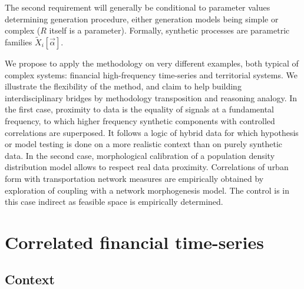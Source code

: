 \documentclass{bmcart}
\begin{document}
The second requirement will generally be conditional to parameter values determining generation procedure, either generation models being simple or complex ($R$ itself is a parameter). Formally, synthetic processes are parametric families $\tilde{X}_i[\vec{\alpha}]$.

We propose to apply the methodology on very different examples, both typical of complex systems: financial high-frequency time-series and territorial systems. We illustrate the flexibility of the method, and claim to help building interdisciplinary bridges by methodology transposition and reasoning analogy. In the first case, proximity to data is the equality of signals at a fundamental frequency, to which higher frequency synthetic components with controlled correlations are superposed. It follows a logic of hybrid data for which hypothesis or model testing is done on a more realistic context than on purely synthetic data. In the second case, morphological calibration of a population density distribution model allows to respect real data proximity. Correlations of urban form with transportation network measures are empirically obtained by exploration of coupling with a network morphogenesis model. The control is in this case indirect as feasible space is empirically determined.



\section*{Correlated financial time-series}


\subsection*{Context}
\end{document}
